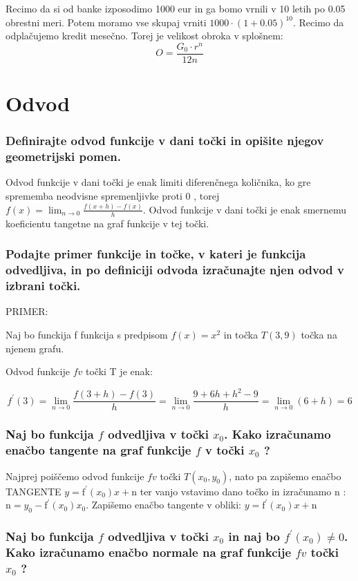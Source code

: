 \documentclass{article}
\begin{document}
Recimo da si od banke izposodimo 1000 eur in ga bomo vrnili v 10 letih po 0.05 obrestni meri. Potem moramo vse skupaj vrniti $1000 \cdot (1+0.05)^10$. Recimo da odplačujemo kredit mesečno. Torej je velikost obroka v splošnem:
$$
O = \frac{G_0 \cdot r^n}{12n}
$$
\section{Odvod}
\subsubsection*{Definirajte odvod funkcije v dani točki in opišite njegov geometrijski pomen.}

Odvod funkcije v dani točki je enak limiti diferenčnega količnika, ko gre sprememba neodvisne spremenljivke proti 0 , torej $f(x)=\lim _{n \rightarrow 0} \frac{f(x+h)-f(x)}{h}$. Odvod funkcije v dani točki je enak smernemu koeficientu tangetne na graf funkcije v tej točki.

\subsubsection*{Podajte primer funkcije in točke, v kateri je funkcija odvedljiva, in po definiciji odvoda izračunajte njen odvod v izbrani točki.}

PRIMER:

Naj bo funckija f funkcija s predpisom $f(x)=x^{2}$ in točka $T(3,9)$ točka na njenem grafu.

Odvod funkcije $f v$ točki T je enak:

$$
f^{\prime}(3)=\lim _{n \rightarrow 0} \frac{f(3+h)-f(3)}{h}=\lim _{n \rightarrow 0} \frac{9+6 h+h^{2}-9}{h}=\lim _{n \rightarrow 0}(6+h)=6
$$
\subsubsection*{Naj bo funkcija $f$ odvedljiva v točki $x_{0}$. Kako izračunamo enačbo tangente na graf funkcije $f$ v točki $x_{0}$ ?}

Najprej poiščemo odvod funkcije $f v$ točki $T\left(x_{0}, y_{0}\right)$, nato pa zapišemo enačbo TANGENTE $y=\mathrm{f}^{\prime}\left(x_{0}\right) x+\mathrm{n}$ ter vanjo vstavimo dano točko in izračunamo $\mathrm{n}$ : $\mathrm{n}=y_{0}-\mathrm{f}^{\prime}\left(x_{0}\right) x_{0}$. Zapišemo enačbo tangente v obliki: $y=\mathrm{f}^{\prime}\left(x_{0}\right) x+\mathrm{n}$

\subsubsection*{Naj bo funkcija $f$ odvedljiva v točki $x_{0}$ in naj bo $f^{\prime}\left(x_{0}\right) \neq 0$. Kako izračunamo enačbo normale na graf funkcije $f v$ točki $x_{0}$ ?}
\end{document}

